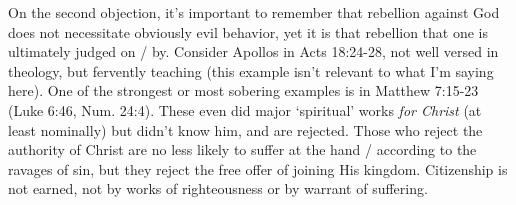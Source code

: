 \documentclass[11pt]{article} %
\begin{document}
On the second objection, it's important to remember that rebellion against God does not necessitate obviously evil behavior, yet it is that rebellion that one is ultimately judged on / by. Consider Apollos in Acts 18:24-28, not well versed in theology, but fervently teaching (this example isn't relevant to what I'm saying here). One of the strongest or most sobering examples is in Matthew 7:15-23 (Luke 6:46, Num. 24:4). These even did major `spiritual' works \emph{for Christ} (at least nominally) but didn't know him, and are rejected. Those who reject the authority of Christ are no less likely to suffer at the hand / according to the ravages of sin, but they reject the free offer of joining His kingdom. Citizenship is not earned, not by works of righteousness or by warrant of suffering. 


\printbibliography
\end{document}

